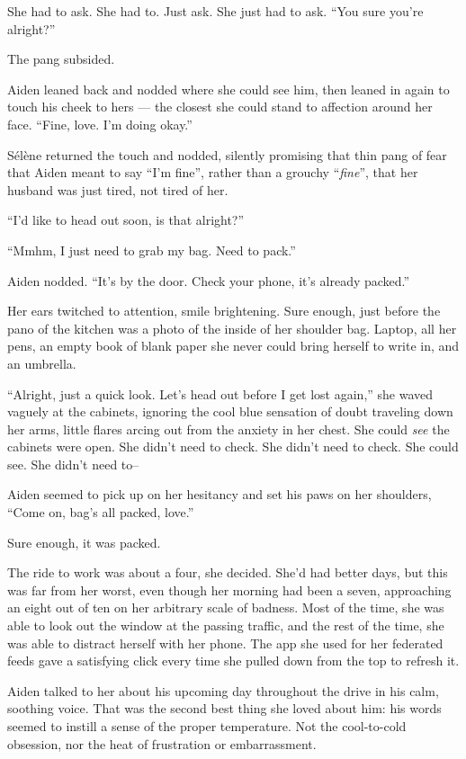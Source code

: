 She had to ask. She had to. Just ask. She just had to ask. ``You sure you're alright?''

The pang subsided.

Aiden leaned back and nodded where she could see him, then leaned in again to touch his cheek to hers --- the closest she could stand to affection around her face. ``Fine, love. I'm doing okay.''

Sélène returned the touch and nodded, silently promising that thin pang of fear that Aiden meant to say ``I'm fine'', rather than a grouchy ``\emph{fine}'', that her husband was just tired, not tired of her.

``I'd like to head out soon, is that alright?''

``Mmhm, I just need to grab my bag. Need to pack.''

Aiden nodded. ``It's by the door. Check your phone, it's already packed.''

Her ears twitched to attention, smile brightening. Sure enough, just before the pano of the kitchen was a photo of the inside of her shoulder bag. Laptop, all her pens, an empty book of blank paper she never could bring herself to write in, and an umbrella.

``Alright, just a quick look. Let's head out before I get lost again,'' she waved vaguely at the cabinets, ignoring the cool blue sensation of doubt traveling down her arms, little flares arcing out from the anxiety in her chest. She could \emph{see} the cabinets were open. She didn't need to check. She didn't need to check. She could see. She didn't need to--

Aiden seemed to pick up on her hesitancy and set his paws on her shoulders, ``Come on, bag's all packed, love.''

Sure enough, it was packed.

\secdiv{}

\noindent The ride to work was about a four, she decided. She'd had better days, but this was far from her worst, even though her morning had been a seven, approaching an eight out of ten on her arbitrary scale of badness. Most of the time, she was able to look out the window at the passing traffic, and the rest of the time, she was able to distract herself with her phone. The app she used for her federated feeds gave a satisfying click every time she pulled down from the top to refresh it.

Aiden talked to her about his upcoming day throughout the drive in his calm, soothing voice. That was the second best thing she loved about him: his words seemed to instill a sense of the proper temperature. Not the cool-to-cold obsession, nor the heat of frustration or embarrassment.

